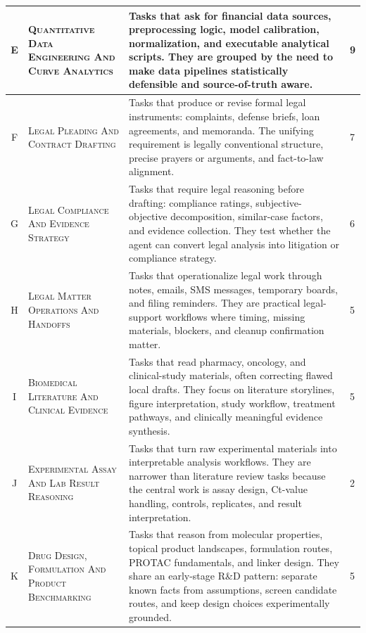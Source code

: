 \documentclass{llmxive}
\begin{document}
{\begin{longtable}{cp{}p{}p{}}
E &
\textsc{Quantitative Data Engineering And Curve Analytics} &
Tasks that ask for financial data sources, preprocessing logic, model calibration, normalization, and executable analytical scripts. They are grouped by the need to make data pipelines statistically defensible and source-of-truth aware. &
9 \\
\midrule[0.75pt]

F &
\textsc{Legal Pleading And Contract Drafting} &
Tasks that produce or revise formal legal instruments: complaints, defense briefs, loan agreements, and memoranda. The unifying requirement is legally conventional structure, precise prayers or arguments, and fact-to-law alignment. &
7 \\
\midrule[0.75pt]

G &
\textsc{Legal Compliance And Evidence Strategy} &
Tasks that require legal reasoning before drafting: compliance ratings, subjective-objective decomposition, similar-case factors, and evidence collection. They test whether the agent can convert legal analysis into litigation or compliance strategy. &
6 \\
\midrule[0.75pt]

H &
\textsc{Legal Matter Operations And Handoffs} &
Tasks that operationalize legal work through notes, emails, SMS messages, temporary boards, and filing reminders. They are practical legal-support workflows where timing, missing materials, blockers, and cleanup confirmation matter. &
5 \\
\midrule[0.75pt]

I &
\textsc{Biomedical Literature And Clinical Evidence} &
Tasks that read pharmacy, oncology, and clinical-study materials, often correcting flawed local drafts. They focus on literature storylines, figure interpretation, study workflow, treatment pathways, and clinically meaningful evidence synthesis. &
5 \\
\midrule[0.75pt]

J &
\textsc{Experimental Assay And Lab Result Reasoning} &
Tasks that turn raw experimental materials into interpretable analysis workflows. They are narrower than literature review tasks because the central work is assay design, Ct-value handling, controls, replicates, and result interpretation. &
2 \\
\midrule[0.75pt]

K &
\textsc{Drug Design, Formulation And Product Benchmarking} &
Tasks that reason from molecular properties, topical product landscapes, formulation routes, PROTAC fundamentals, and linker design. They share an early-stage R\&D pattern: separate known facts from assumptions, screen candidate routes, and keep design choices experimentally grounded. &
5 \\
\midrule[0.75pt]


\end{longtable}}
\end{document}
